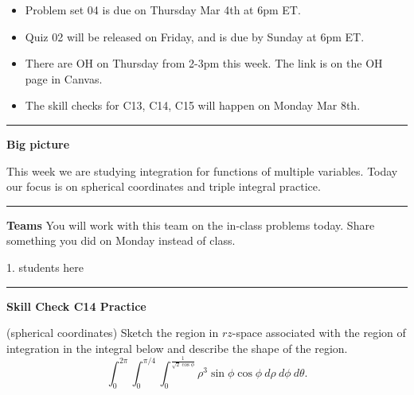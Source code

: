 \documentclass[12pt,letterpaper,noanswers]{exam}
\begin{document}
 \pdfpageheight 11in 
  \pdfpagewidth 8.5in





\begin{itemize}
\itemsep0em
    \item Problem set 04 is due on Thursday Mar 4th at 6pm ET.
    \item Quiz 02 will be released on Friday, and is due by Sunday at 6pm ET.
    \item There are OH on Thursday from 2-3pm this week.  The link is on the OH page in Canvas.
    \item The skill checks for C13, C14, C15 will happen on Monday Mar 8th.
\end{itemize}

\hrule
\vspace{0.2cm}


\noindent\textbf{Big picture}

This week we are studying integration for functions of multiple variables.  Today our focus is on spherical coordinates and triple integral practice.

\vspace{0.2cm}
\hrule
\vspace{0.2cm}

\noindent\textbf{Teams}
You will work with this team on the in-class problems today.  Share something you did on Monday instead of class.
\begin{multicols}{2}
1.  students here

\end{multicols}

\hrule
\vspace{0.2cm}


\noindent\textbf{Skill Check C14 Practice}

\begin{questions}
\item (spherical coordinates) Sketch the region in $rz$-space associated with the region of integration in the integral below and describe the shape of the region.
\[\int_0^{2\pi}\int_0^{\pi/4}\int_0^{\frac{1}{\sqrt{2}\cos\phi}} \rho^3\sin\phi\cos\phi\ d\rho\ d\phi\ d\theta.\]
\end{questions}
\end{document}
